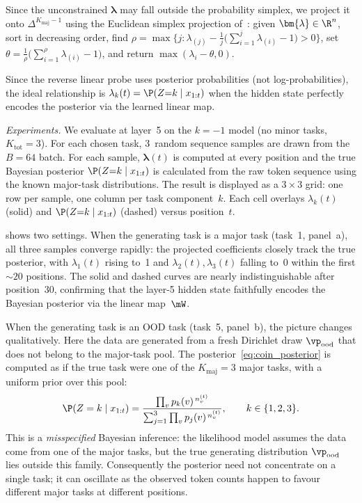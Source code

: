 Since the unconstrained $\bm{\lambda}$ may fall outside the probability
simplex, we project it onto $\Delta^{K_{\mathrm{maj}}-1}$ using the Euclidean
simplex projection of~\citet{duchi2008efficient}:
given $\bm{\lambda} \in \R^n$, sort in decreasing order, find
$\rho = \max\bigl\{j : \lambda_{(j)} - \tfrac{1}{j}
  \bigl(\sum_{i=1}^{j}\lambda_{(i)} - 1\bigr) > 0\bigr\}$,
set $\theta = \tfrac{1}{\rho}\bigl(\sum_{i=1}^{\rho}\lambda_{(i)} - 1\bigr)$,
and return $\max(\lambda_i - \theta, 0)$.

Since the reverse linear probe uses posterior probabilities (not
log-probabilities), the ideal relationship is
$\lambda_k(t) = \P(Z{=}k \mid x_{1:t})$ when the hidden state perfectly
encodes the posterior via the learned linear map.

\emph{Experiments.}
We evaluate at layer~5 on the $k = -1$ model (no minor tasks, $K_{\mathrm{tot}}
= 3$).
For each chosen task, 3~random sequence samples are drawn from the $B = 64$
batch.
For each sample, $\bm{\lambda}(t)$ is computed at every position and the true
Bayesian posterior $\P(Z{=}k \mid x_{1:t})$ is calculated from the raw token
sequence using the known major-task distributions.
The result is displayed as a $3 \times 3$ grid: one row per sample, one column
per task component~$k$.
Each cell overlays $\lambda_k(t)$ (solid) and $\P(Z{=}k \mid x_{1:t})$
(dashed) versus position~$t$.

 shows two settings.
When the generating task is a major task (task~1, panel~a), all three samples
converge rapidly: the projected coefficients closely track the true posterior,
with $\lambda_1(t)$ rising to~1 and $\lambda_2(t), \lambda_3(t)$ falling to~0
within the first ${\sim}20$ positions.
The solid and dashed curves are nearly indistinguishable after position~30,
confirming that the layer-5 hidden state faithfully encodes the Bayesian
posterior via the linear map~$\mW$.

When the generating task is an OOD task (task~5, panel~b), the picture changes
qualitatively.
Here the data are generated from a fresh Dirichlet draw $\vp_{\mathrm{ood}}$
that does not belong to the major-task pool.
The posterior~\eqref{eq:coin_posterior} is computed as if the true task were one
of the $K_{\mathrm{maj}} = 3$ major tasks, with a uniform prior over this pool:
\[
  \P(Z = k \mid x_{1:t})
  = \frac{\prod_{v} p_k(v)^{\,n_v^{(t)}}}
         {\sum_{j=1}^{3} \prod_{v} p_j(v)^{\,n_v^{(t)}}},
  \qquad k \in \{1, 2, 3\}.
\]
This is a \emph{misspecified} Bayesian inference: the likelihood model assumes
the data come from one of the major tasks, but the true generating distribution
$\vp_{\mathrm{ood}}$ lies outside this family.
Consequently the posterior need not concentrate on a single task;
it can oscillate as the observed token counts happen to favour different
major tasks at different positions.

